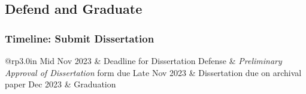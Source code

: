 \subsection{Defend and Graduate}
\begin{frame}[t]
	\frametitle{Timeline:  Submit Dissertation}
\Large


\begin{tabular}{@{}rp{3.0in}}
	Mid Nov 2023 & Deadline for Dissertation Defense \cr
	 & {\it Preliminary Approval of Dissertation} form due \cr
	 Late Nov 2023 & Dissertation due on archival paper  Dec 2023 & Graduation \cr
\end{tabular}
\end{frame}
